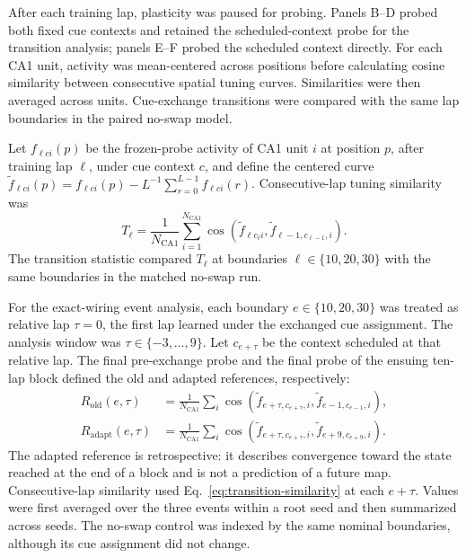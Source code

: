 After each training lap, plasticity was paused for probing. Panels B--D
probed both fixed cue contexts and retained the scheduled-context probe for
the transition analysis; panels E--F probed the scheduled context directly.
For each CA1 unit, activity was mean-centered
across positions before calculating cosine similarity between consecutive
spatial tuning curves. Similarities were then averaged across units. Cue-exchange
transitions were compared with the same lap boundaries in the paired no-swap
model.

Let $f_{\ell c i}(p)$ be the frozen-probe activity of CA1 unit $i$ at position
$p$, after training lap $\ell$, under cue context $c$, and define the centered
curve $\widetilde f_{\ell c i}(p)=f_{\ell c i}(p)-L^{-1}
\sum_{r=0}^{L-1}f_{\ell c i}(r)$. Consecutive-lap tuning similarity was
\begin{equation}
T_\ell=\frac{1}{N_{\mathrm{CA1}}}\sum_{i=1}^{N_{\mathrm{CA1}}}
 \operatorname{cos}(\widetilde f_{\ell c_\ell i},
                    \widetilde f_{\ell-1,c_{\ell-1},i}).
\label{eq:transition-similarity}
\end{equation}
The transition statistic compared $T_\ell$ at boundaries
$\ell\in\{10,20,30\}$ with the same boundaries in the matched no-swap run.

For the exact-wiring event analysis, each boundary $e\in\{10,20,30\}$ was
treated as relative lap $\tau=0$, the first lap learned under the exchanged
cue assignment. The analysis window was $\tau\in\{-3,\ldots,9\}$. Let
$c_{e+\tau}$ be the context scheduled at that relative lap. The final
pre-exchange probe and the final probe of the ensuing ten-lap block defined
the old and adapted references, respectively:
\begin{align}
R_{\mathrm{old}}(e,\tau)
 &=\frac{1}{N_{\mathrm{CA1}}}\sum_i
 \operatorname{cos}\!\left(
 \widetilde f_{e+\tau,c_{e+\tau},i},
 \widetilde f_{e-1,c_{e-1},i}\right),\\
R_{\mathrm{adapt}}(e,\tau)
 &=\frac{1}{N_{\mathrm{CA1}}}\sum_i
 \operatorname{cos}\!\left(
 \widetilde f_{e+\tau,c_{e+\tau},i},
 \widetilde f_{e+9,c_{e+9},i}\right).
\label{eq:remapping-references}
\end{align}
The adapted reference is retrospective: it describes convergence toward the
state reached at the end of a block and is not a prediction of a future map.
Consecutive-lap similarity used Eq.~\ref{eq:transition-similarity} at each
$e+\tau$. Values were first averaged over the three events within a root seed
and then summarized across seeds. The no-swap control was indexed by the same
nominal boundaries, although its cue assignment did not change.

